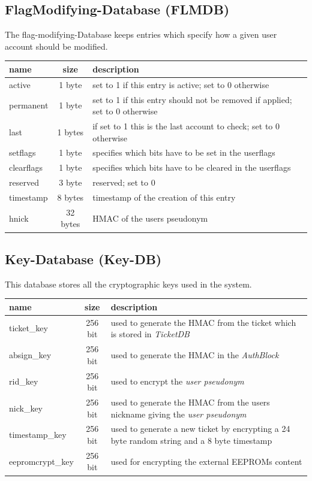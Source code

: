 \subsection{FlagModifying-Database (FLMDB)}
The flag-modifying-Database keeps entries which specify how a given user account should be modified. \\
\begin{tabular}{|l|c|l|} \hline
name & size & description \\ \hline 
active     & 1 byte    & set to 1 if this entry is active; set to 0 otherwise \\
permanent  & 1 byte & set to 1 if this entry should not be removed if applied; set to 0 otherwise \\
last       & 1 bytes & if set to 1 this is the last account to check; set to 0 otherwise \\ 
setflags   & 1 byte & specifies which bits have to be set in the userflags\\
clearflags & 1 byte & specifies which bits have to be cleared in the userflags\\
reserved   & 3 byte & reserved; set to 0\\
timestamp  & 8 bytes & timestamp of the creation of this entry\\
hnick      & 32 bytes & HMAC of the users pseudonym\\
\hline
\end{tabular}


\subsection{Key-Database (Key-DB)}
This database stores all the cryptographic keys used in the system.\\
\begin{tabular}{|l|c|p{8cm}|} \hline
name & size & description \\ \hline 
ticket\_key            & 256 bit & used to generate the HMAC from the ticket which is stored in \textit{TicketDB} \\
absign\_key      & 256 bit & used to generate the HMAC in the \textit{AuthBlock} \\
rid\_key         & 256 bit & used to encrypt the \textit{user pseudonym} \\
nick\_key        & 256 bit & used to generate the HMAC from the users nickname giving the \textit{user pseudonym} \\
timestamp\_key   & 256 bit & used to generate a new ticket by encrypting a 24 byte random string and a 8 byte timestamp \\
eepromcrypt\_key & 256 bit & used for encrypting the external EEPROMs content \\
\hline
\end{tabular}

